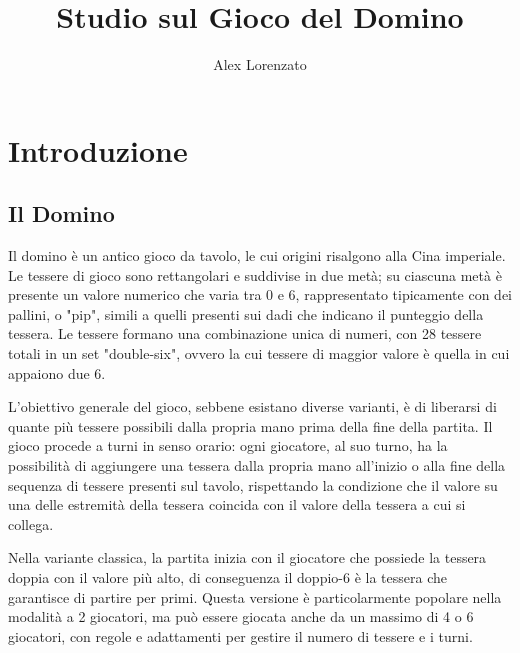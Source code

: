 \documentclass[a4paper,12pt]{report} %
\begin{document}
\title{Studio sul Gioco del Domino}
\author{Alex Lorenzato}
\maketitle

\tableofcontents %

\chapter{Introduzione}

\section{Il Domino}

Il domino è un antico gioco da tavolo, le cui origini risalgono alla Cina imperiale. Le tessere di gioco sono rettangolari e suddivise in due metà; su ciascuna metà è presente un valore numerico che varia tra 0 e 6, rappresentato tipicamente con dei pallini, o "pip", simili a quelli presenti sui dadi che indicano il punteggio della tessera. Le tessere formano una combinazione unica di numeri, con 28 tessere totali in un set "double-six", ovvero la cui tessere di maggior valore è quella in cui appaiono due 6.

L'obiettivo generale del gioco, sebbene esistano diverse varianti, è di liberarsi di quante più tessere possibili dalla propria mano prima della fine della partita. Il gioco procede a turni in senso orario: ogni giocatore, al suo turno, ha la possibilità di aggiungere una tessera dalla propria mano all'inizio o alla fine della sequenza di tessere presenti sul tavolo, rispettando la condizione che il valore su una delle estremità della tessera coincida con il valore della tessera a cui si collega. 

Nella variante classica, la partita inizia con il giocatore che possiede la tessera doppia con il valore più alto, di conseguenza il doppio-6 è la tessera che garantisce di partire per primi. Questa versione è particolarmente popolare nella modalità a 2 giocatori, ma può essere giocata anche da un massimo di 4 o 6 giocatori, con regole e adattamenti per gestire il numero di tessere e i turni.
\end{document}
